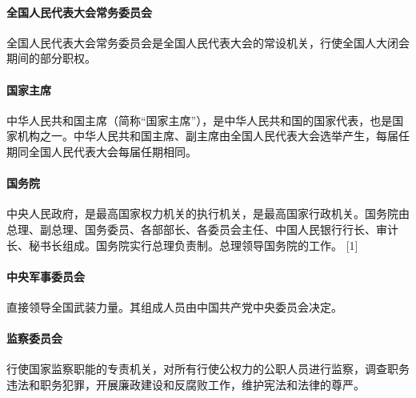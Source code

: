 \paragraph{全国人民代表大会常务委员会} 全国人民代表大会常务委员会是全国人民代表大会的常设机关，行使全国人大闭会期间的部分职权。

\paragraph{国家主席} 中华人民共和国主席（简称“国家主席”），是中华人民共和国的国家代表，也是国家机构之一。中华人民共和国主席、副主席由全国人民代表大会选举产生，每届任期同全国人民代表大会每届任期相同。

\paragraph{国务院} 中央人民政府，是最高国家权力机关的执行机关，是最高国家行政机关。国务院由总理、副总理、国务委员、各部部长、各委员会主任、中国人民银行行长、审计长、秘书长组成。国务院实行总理负责制。总理领导国务院的工作。 [1]

\paragraph{中央军事委员会} 直接领导全国武装力量。其组成人员由中国共产党中央委员会决定。

\paragraph{监察委员会} 行使国家监察职能的专责机关，对所有行使公权力的公职人员进行监察，调查职务违法和职务犯罪，开展廉政建设和反腐败工作，维护宪法和法律的尊严。

